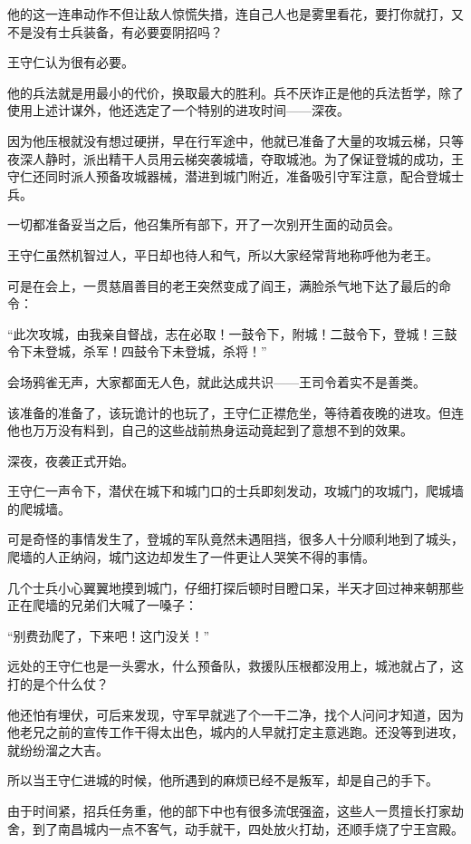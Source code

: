 \begin{multicols}{\theparacolNo}
他的这一连串动作不但让敌人惊慌失措，连自己人也是雾里看花，要打你就打，又不是没有士兵装备，有必要耍阴招吗？

王守仁认为很有必要。

他的兵法就是用最小的代价，换取最大的胜利。兵不厌诈正是他的兵法哲学，除了使用上述计谋外，他还选定了一个特别的进攻时间——深夜。

因为他压根就没有想过硬拼，早在行军途中，他就已准备了大量的攻城云梯，只等夜深人静时，派出精干人员用云梯突袭城墙，夺取城池。为了保证登城的成功，王守仁还同时派人预备攻城器械，潜进到城门附近，准备吸引守军注意，配合登城士兵。

一切都准备妥当之后，他召集所有部下，开了一次别开生面的动员会。

王守仁虽然机智过人，平日却也待人和气，所以大家经常背地称呼他为老王。

可是在会上，一贯慈眉善目的老王突然变成了阎王，满脸杀气地下达了最后的命令：

“此次攻城，由我亲自督战，志在必取！一鼓令下，附城！二鼓令下，登城！三鼓令下未登城，杀军！四鼓令下未登城，杀将！”

会场鸦雀无声，大家都面无人色，就此达成共识——王司令着实不是善类。

该准备的准备了，该玩诡计的也玩了，王守仁正襟危坐，等待着夜晚的进攻。但连他也万万没有料到，自己的这些战前热身运动竟起到了意想不到的效果。

深夜，夜袭正式开始。

王守仁一声令下，潜伏在城下和城门口的士兵即刻发动，攻城门的攻城门，爬城墙的爬城墙。

可是奇怪的事情发生了，登城的军队竟然未遇阻挡，很多人十分顺利地到了城头，爬墙的人正纳闷，城门这边却发生了一件更让人哭笑不得的事情。

几个士兵小心翼翼地摸到城门，仔细打探后顿时目瞪口呆，半天才回过神来朝那些正在爬墙的兄弟们大喊了一嗓子：

“别费劲爬了，下来吧！这门没关！”

远处的王守仁也是一头雾水，什么预备队，救援队压根都没用上，城池就占了，这打的是个什么仗？

他还怕有埋伏，可后来发现，守军早就逃了个一干二净，找个人问问才知道，因为他老兄之前的宣传工作干得太出色，城内的人早就打定主意逃跑。还没等到进攻，就纷纷溜之大吉。

所以当王守仁进城的时候，他所遇到的麻烦已经不是叛军，却是自己的手下。

由于时间紧，招兵任务重，他的部下中也有很多流氓强盗，这些人一贯擅长打家劫舍，到了南昌城内一点不客气，动手就干，四处放火打劫，还顺手烧了宁王宫殿。


\end{multicols}
